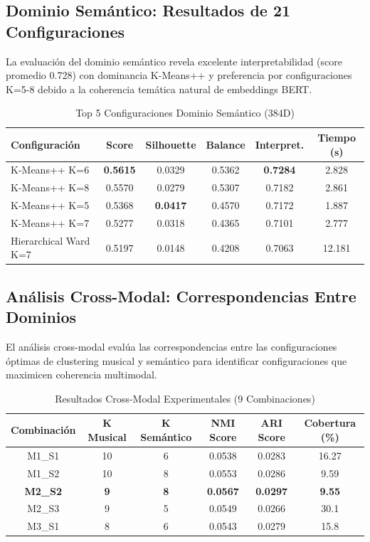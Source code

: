 \documentclass[12pt,a4paper]{report}
\begin{document}
\subsection{Dominio Semántico: Resultados de 21 Configuraciones}

La evaluación del dominio semántico revela excelente interpretabilidad (score promedio 0.728) con dominancia K-Means++ y preferencia por configuraciones K=5-8 debido a la coherencia temática natural de embeddings BERT.

\begin{table}[H]
\centering
\caption{Top 5 Configuraciones Dominio Semántico (384D)}
\begin{tabular}{|l|c|c|c|c|c|}
\hline
\textbf{Configuración} & \textbf{Score} & \textbf{Silhouette} & \textbf{Balance} & \textbf{Interpret.} & \textbf{Tiempo (s)} \\
\hline
K-Means++ K=6 & \textbf{0.5615} & 0.0329 & 0.5362 & \textbf{0.7284} & 2.828 \\
\hline
K-Means++ K=8 & 0.5570 & 0.0279 & 0.5307 & 0.7182 & 2.861 \\
\hline
K-Means++ K=5 & 0.5368 & \textbf{0.0417} & 0.4570 & 0.7172 & 1.887 \\
\hline
K-Means++ K=7 & 0.5277 & 0.0318 & 0.4365 & 0.7101 & 2.777 \\
\hline
Hierarchical Ward K=7 & 0.5197 & 0.0148 & 0.4208 & 0.7063 & 12.181 \\
\hline
\end{tabular}
\end{table}

\subsection{Análisis Cross-Modal: Correspondencias Entre Dominios}

El análisis cross-modal evalúa las correspondencias entre las configuraciones óptimas de clustering musical y semántico para identificar configuraciones que maximicen coherencia multimodal.

\begin{table}[H]
\centering
\caption{Resultados Cross-Modal Experimentales (9 Combinaciones)}
\begin{tabular}{|c|c|c|c|c|c|}
\hline
\textbf{Combinación} & \textbf{K Musical} & \textbf{K Semántico} & \textbf{NMI Score} & \textbf{ARI Score} & \textbf{Cobertura (\%)} \\
\hline
M1\_S1 & 10 & 6 & 0.0538 & 0.0283 & 16.27 \\
\hline
M1\_S2 & 10 & 8 & 0.0553 & 0.0286 & 9.59 \\
\hline
\textbf{M2\_S2} & \textbf{9} & \textbf{8} & \textbf{0.0567} & \textbf{0.0297} & \textbf{9.55} \\
\hline
M2\_S3 & 9 & 5 & 0.0549 & 0.0266 & 30.1 \\
\hline
M3\_S1 & 8 & 6 & 0.0543 & 0.0279 & 15.8 \\
\hline
\end{tabular}
\end{table}
\end{document}
